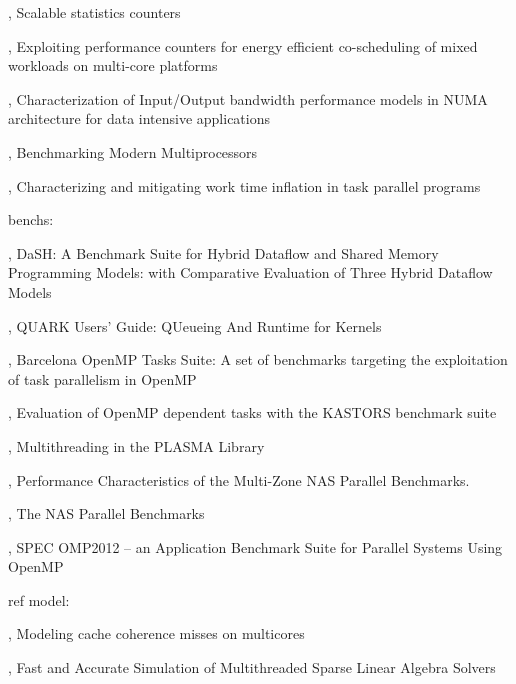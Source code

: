 \cite{Dice2013}, Scalable statistics counters

\cite{Libutti2014}, Exploiting performance counters for energy efficient co-scheduling of mixed workloads on multi-core platforms

\cite{Li2013}, Characterization of Input/Output bandwidth performance models in NUMA architecture for data intensive applications

\cite{Bienia2011}, Benchmarking Modern Multiprocessors

\cite{Olivier2013}, Characterizing and mitigating work time inflation in task parallel programs

benchs:

\cite{Gajinov2014}, DaSH: A Benchmark Suite for Hybrid Dataflow and Shared Memory Programming Models: with Comparative Evaluation of Three Hybrid Dataflow Models

\cite{YarKhan2011}, QUARK Users' Guide: QUeueing And Runtime for Kernels

\cite{Duran2009}, Barcelona OpenMP Tasks Suite: A set of benchmarks targeting the exploitation of task parallelism in OpenMP

\cite{Virouleau2014}, Evaluation of OpenMP dependent tasks with the KASTORS benchmark suite

\cite{Kurzak2013}, Multithreading in the PLASMA Library

\cite{Jin2004}, Performance Characteristics of the Multi-Zone NAS Parallel Benchmarks.

\cite{Bailey1994}, The NAS Parallel Benchmarks

\cite{Muller2012}, SPEC OMP2012 -- an Application Benchmark Suite for Parallel Systems Using OpenMP


ref model:

\cite{Pan2014}, Modeling cache coherence misses on multicores

\cite{Stanisic2016}, Fast and Accurate Simulation of Multithreaded Sparse Linear Algebra Solvers



%


